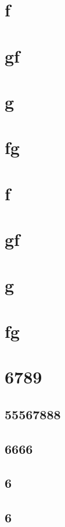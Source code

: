 \documentclass[11pt,a4paper]{article}
\begin{document}
\section{f}

\section{gf}

\section{g}

\section{fg}

\section{f}

\section{gf}

\section{g}

\section{fg}

\section{6789}

\subsection{55567888}

\subsection{6666}

\subsection{6}

\subsection{6}
\end{document}

